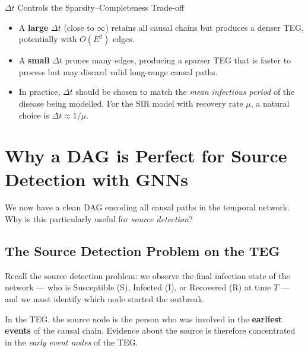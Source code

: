 \begin{keyinsight}{$\Delta t$ Controls the Sparsity--Completeness Trade-off}
\begin{itemize}[noitemsep]
    \item A \textbf{large} $\Delta t$ (close to $\infty$) retains all causal
          chains but produces a denser TEG, potentially with $O(E^2)$ edges.
    \item A \textbf{small} $\Delta t$ prunes many edges, producing a sparser
          TEG that is faster to process but may discard valid long-range causal
          paths.
    \item In practice, $\Delta t$ should be chosen to match the \emph{mean
          infectious period} of the disease being modelled. For the SIR model
          with recovery rate $\mu$, a natural choice is $\Delta t \approx 1/\mu$.
\end{itemize}
\end{keyinsight}

\section{Why a DAG is Perfect for Source Detection with GNNs}
\label{sec:teg_dag_gnn}

We now have a clean DAG encoding all causal paths in the temporal network. Why
is this particularly useful for \emph{source detection}?

\subsection{The Source Detection Problem on the TEG}

Recall the source detection problem: we observe the final infection state of
the network --- who is Susceptible (S), Infected (I), or Recovered (R) at time
$T$ --- and we must identify which node started the outbreak.

In the TEG, the source node is the person who was involved in the
\textbf{earliest events} of the causal chain. Evidence about the source is
therefore concentrated in the \emph{early event nodes} of the TEG.

